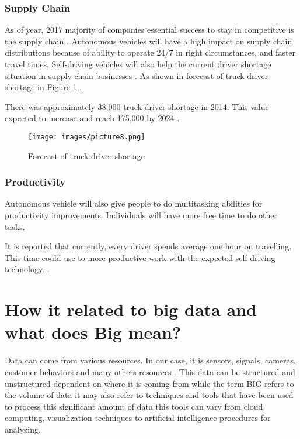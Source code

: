 \documentclass[sigconf]{acmart}
\begin{document}
\subsubsection{Supply Chain} As of year, 2017 majority of companies essential success to stay in competitive is the supply chain \cite{ATA}.  Autonomous vehicles will have a high impact on supply chain distributions because of ability to operate 24/7 in right circumstances, and faster travel times. Self-driving vehicles will also help the current driver shortage situation in supply chain businesses \cite{ATA}. As shown in forecast of truck driver shortage in Figure \ref{fig:small} \cite{ATA}.

\par There was approximately 38,000 truck driver shortage in 2014. This value expected to increase and reach 175,000 by 2024 \cite{ATA}.

\begin{figure}[!ht]
  \centering
      \texttt{[image: images/picture8.png]}
  \caption{Forecast of truck driver shortage}\label{fig:small}
\end{figure}

\subsubsection{Productivity}Autonomous vehicle will also give people to do multitasking abilities for productivity improvements. Individuals will have more free time to do other tasks. 

\par It is reported that currently, every driver spends average one hour on travelling\cite{michigan}. This time could use to more productive work with the expected self-driving technology. \cite{michigan}.



\section{How it related to big data and what does Big mean?}
\par Data can come from various resources. In our case, it is sensors, signals, cameras, customer behaviors and many others resources \cite{www-webo}. This data can be structured and unstructured dependent on where it is coming from while the term BIG refers to the volume of data it may also refer to techniques and tools that have been used to process this significant amount of data this tools can vary from cloud computing, visualization techniques to artificial intelligence procedures for analyzing\cite{www-webo}.
\end{document}
